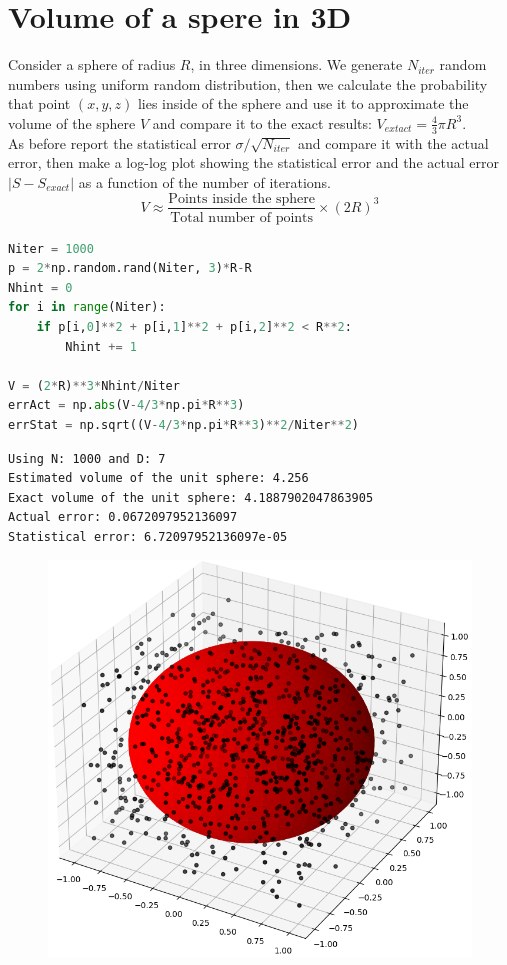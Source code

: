 \documentclass{article}
\begin{document}
\section{Volume of a spere in 3D}
Consider a sphere of radius $R$, in three dimensions. We generate $N_{iter}$ random numbers using uniform random distribution, then we calculate the probability that point $(x,y,z)$ lies inside of the sphere and use it to approximate the volume of the sphere $V$ and compare it to the exact results: $V_{extact}=\frac43\pi R^3$.\\
As before report the statistical error $\sigma/\sqrt{N_{iter}}$ and compare it with the actual error, then make a log-log plot showing the statistical error and the actual error $|S-S_{exact}|$ as a function of the number of iterations.
\begin{equation}
    V\approx\frac{\text{Points inside the sphere}}{\text{Total number of points}}\times(2R)^3
\end{equation}
\begin{lstlisting}[language=Python]
Niter = 1000
p = 2*np.random.rand(Niter, 3)*R-R
Nhint = 0
for i in range(Niter):
    if p[i,0]**2 + p[i,1]**2 + p[i,2]**2 < R**2:
        Nhint += 1
        
V = (2*R)**3*Nhint/Niter
errAct = np.abs(V-4/3*np.pi*R**3)
errStat = np.sqrt((V-4/3*np.pi*R**3)**2/Niter**2)
\end{lstlisting}
\begin{lstlisting}
Using N: 1000 and D: 7
Estimated volume of the unit sphere: 4.256
Exact volume of the unit sphere: 4.1887902047863905
Actual error: 0.0672097952136097
Statistical error: 6.72097952136097e-05
\end{lstlisting}
\begin{figure}[H]
    \centering
    \includegraphics[width=.75\linewidth]{images/Figure2.png}
    \caption{}
    \label{fig:2}
\end{figure}
\end{document}
